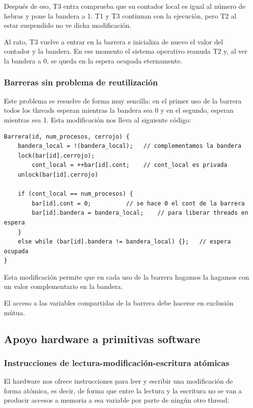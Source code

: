 \documentclass[10pt,a4paper,spanish]{report}
\begin{document}
Después de eso, T3 entra comprueba que su contador local es igual al número de hebras y pone la bandera a 1. T1 y T3 continuan con la ejecución, pero T2 al estar suspendido no ve dicha modificación. 

Al rato, T3 vuelve a entrar en la barrera e inicializa de nuevo el valor del contador y la bandera. En ese momento el sistema operativo reanuda T2 y, al ver la bandera a 0, se queda en la espera ocupada eternamente.

\textcolor{azul}{\subsubsection{Barreras sin problema de reutilización}}
Este problema se resuelve de forma muy sencilla: en el primer uso de la barrera todos los threads esperan mientras la bandera sea 0 y en el segundo, esperan mientras sea 1. Esta modificación nos lleva al siguiente código:

\begin{verbatim}
Barrera(id, num_procesos, cerrojo) {
    bandera_local = !(bandera_local);   // complementamos la bandera
    lock(bar[id].cerrojo);
        cont_local = ++bar[id].cont;    // cont_local es privada
    unlock(bar[id].cerrojo)

    if (cont_local == num_procesos) {
        bar[id].cont = 0;          // se hace 0 el cont de la barrera
        bar[id].bandera = bandera_local;    // para liberar threads en espera
    }
    else while (bar[id].bandera != bandera_local) {};   // espera ocupada
}
\end{verbatim}

Esta modificación permite que en cada uso de la barrera hagamos la hagamos con un valor complementario en la bandera.

El acceso a las variables compartidas de la barrera debe hacerse en exclusión mútua.

\textcolor{azul}{\subsection{Apoyo hardware a primitivas software}}
\textcolor{azul}{\subsubsection{Instrucciones de lectura-modificación-escritura atómicas}}
El hardware nos ofrece instrucciones para leer y escribir una modificación de forma atómica, es decir, de forma que entre la lectura y la escritura no se van a producir accesos a memoria a esa variable por parte de ningún otro thread.
\end{document}
